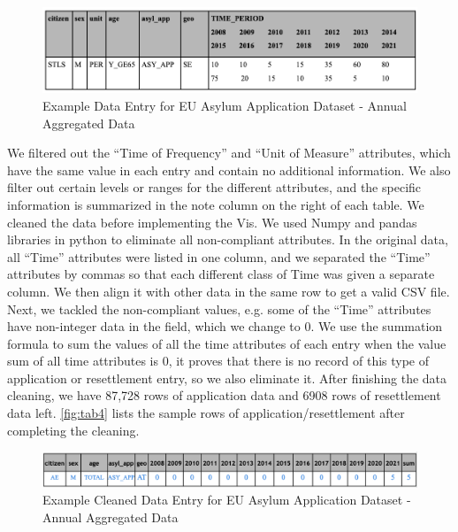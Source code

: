 \documentclass[journal]{vgtc}                %
\begin{document}
\begin{figure}[tb]
  \centering %
  \includegraphics[width=\columnwidth]{tab3.png}
  \caption{Example Data Entry for EU Asylum Application Dataset - Annual Aggregated Data}
  \label{fig:tab3}
 \end{figure}

We filtered out the “Time of Frequency” and “Unit of Measure” attributes, which have the same value in each entry and contain no additional information. We also filter out certain levels or ranges for the different attributes, and the specific information is summarized in the note column on the right of each table. We cleaned the data before implementing the Vis. We used Numpy and pandas libraries in python to eliminate all non-compliant attributes. In the original data, all “Time” attributes were listed in one column, and we separated the “Time” attributes by commas so that each different class of Time was given a separate column. We then align it with other data in the same row to get a valid CSV file. Next, we tackled the non-compliant values, e.g. some of the “Time” attributes have non-integer data in the field, which we change to 0. We use the summation formula to sum the values of all the time attributes of each entry when the value sum of all time attributes is 0, it proves that there is no record of this type of application or resettlement entry, so we also eliminate it. After finishing the data cleaning, we have 87,728 rows of application data and 6908 rows of resettlement data left. \autoref{fig:tab4} lists the sample rows of application/resettlement after completing the cleaning.

\begin{figure}[tb]
  \centering %
  \includegraphics[width=\columnwidth]{tab4.png}
  \caption{Example Cleaned Data Entry for EU Asylum Application Dataset - Annual Aggregated Data}
  \label{fig:tab4}
 \end{figure}
\end{document}
